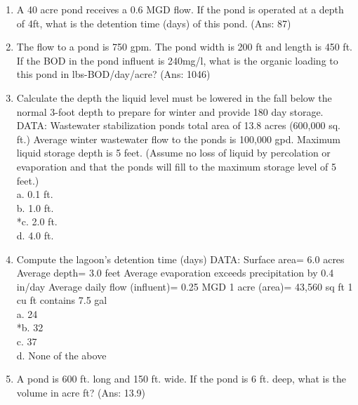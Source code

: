 \begin{enumerate}

\item  A 40 acre pond receives a 0.6 MGD flow.  If the pond is operated at a depth of 4ft, what is the detention time (days) of this pond. (Ans: 87)\\


\item  The flow to a pond is 750 gpm. The pond width is 200 ft and length is 450 ft. If the BOD in the pond influent is 240mg/l, what is the organic loading to this pond in lbs-BOD/day/acre? (Ans: 1046)\\


\item  Calculate the depth the liquid level must be lowered in the fall below the normal 3-foot depth to prepare for winter and provide 180 day storage.
DATA: Wastewater stabilization ponds total area of 13.8 acres (600,000 sq. ft.)
Average winter wastewater flow to the ponds is 100,000 gpd.  Maximum liquid storage depth is 5 feet.
(Assume no loss of liquid by percolation or evaporation and that the ponds will fill to the maximum storage level of 5 feet.) \\


a. 0.1 ft. \\

b. 1.0 ft. \\

*c. 2.0 ft. \\

d. 4.0 ft. \\

\item  Compute the lagoon's detention time (days)
DATA: Surface area= 6.0 acres
Average depth= 3.0 feet
Average evaporation exceeds precipitation by 0.4 in/day
Average daily flow (influent)= 0.25 MGD
1 acre (area)= 43,560 sq ft
1 cu ft contains 7.5 gal \\


a. 24 \\

*b. 32 \\

c. 37 \\

d. None of the above \\

\item  A pond is 600 ft. long and 150 ft. wide. If the pond is 6 ft. deep, what is the volume in  acre ft? (Ans: 13.9)\\


\end{enumerate}
